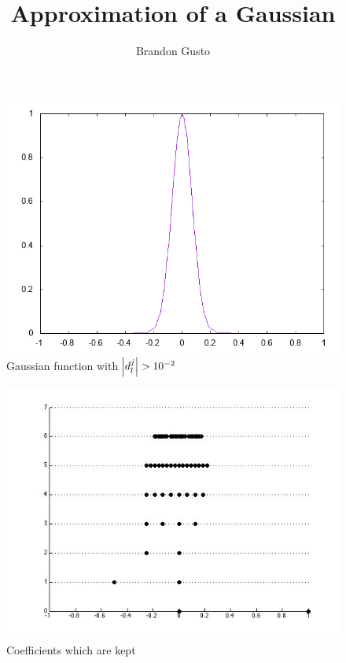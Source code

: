 \documentclass[10pt]{article}
\title{Approximation of a Gaussian}
\author{Brandon Gusto}
\begin{document}

\begin{figure}
\center
\includegraphics[scale=0.7]{solution10_minus2.png}
\caption{Gaussian function with $ \abs{d_{l}^{j}} > 10^{-2} $ }
\end{figure}

\begin{figure}
\center
\includegraphics[scale=0.7]{5minus3_threshold.jpg}
\caption{Coefficients which are kept}
\end{figure}
\end{document}

